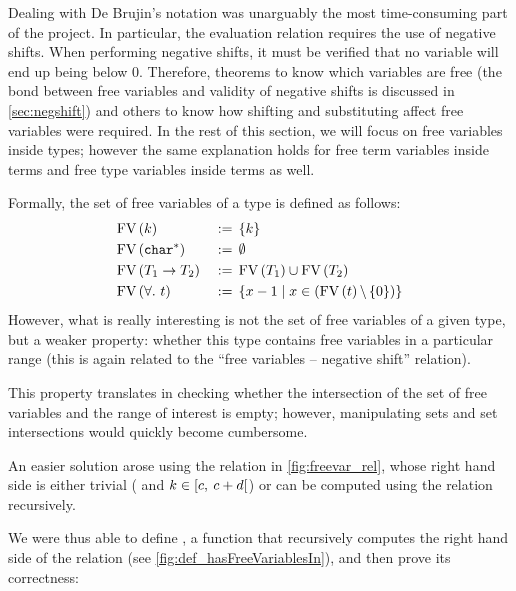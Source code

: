 
\newcommand{\cdrange}[0]{\srangelo{c}{c+d}}

Dealing with De Brujin's notation was unarguably the most time-consuming part of the project. In particular,
the evaluation relation requires the use of negative shifts. 
When performing negative shifts, it must be verified that no variable will end up being below 0. 
Therefore, theorems to know which variables are free (the bond between free variables and validity of negative shifts is discussed in \cref{sec:negshift}) and others to know how shifting and substituting affect free variables were required. In the rest of this section, we will focus on free variables inside types; however the same explanation holds for free term variables inside terms and free type variables inside terms as well. 

Formally, the set of free variables of a type is defined as follows:
\begin{alignat*}{2}
        &\textup{FV}\left(k\right) &&\mathrel{:=\,} \left\{ k \right\} \\
        &\textup{FV}\left(\texttt{char}^{*}\right) &&\mathrel{:=\,} \emptyset \\
        &\textup{FV}\left({T_1} \rightarrow{}{} {T_2}\right) &&\mathrel{:=\,} \textup{FV}\left(T_1\right) \cup \textup{FV}\left(T_2\right)\\
        &\textup{FV}\left(\forall{}.\ {t}\right) &&\mathrel{:=\,} \left\{ x - 1 \mid x \in \left(\textup{FV}\left(t\right) \backslash \left\{ 0 \right\}\right) \right\} 
\end{alignat*}
However, what is really interesting is not the set of free variables of a given type, but a weaker property: whether this type contains free variables in a particular range (this is again related to the ``free variables -- negative shift'' relation). 

This property translates in checking whether the intersection of the set of free variables and the range of interest is empty; however, manipulating sets and set intersections would quickly become cumbersome.

An easier solution arose using the relation in \cref{fig:freevar_rel}, whose right hand side is either trivial ( and $k \in \cdrange$) or can be computed using the relation recursively.

We were thus able to define , a function that recursively computes the right hand side of the relation (see \cref{fig:def_hasFreeVariablesIn}), and then prove its correctness:

